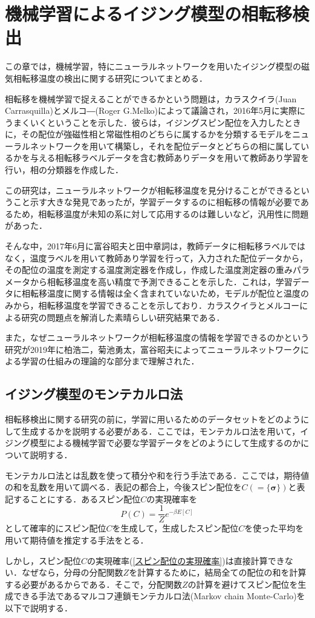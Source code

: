 \documentclass[a4paper,11pt]{jsreport}
\begin{document}
\chapter{機械学習によるイジング模型の相転移検出}
この章では，機械学習，特にニューラルネットワークを用いたイジング模型の磁気相転移温度の検出に関する研究についてまとめる．\par
相転移を機械学習で捉えることができるかという問題は，カラスクイラ(Juan Carrasquilla)とメルコ―(Roger G.Melko)によって議論され，2016年5月に実際にうまくいくということを示した．彼らは，イジングスピン配位を入力したときに，その配位が強磁性相と常磁性相のどちらに属するかを分類するモデルをニューラルネットワークを用いて構築し，それを配位データとどちらの相に属しているかを与える相転移ラベルデータを含む教師ありデータを用いて教師あり学習を行い，相の分類器を作成した．\par
この研究は，ニューラルネットワークが相転移温度を見分けることができるということ示す大きな発見であったが，学習データするのに相転移の情報が必要であるため，相転移温度が未知の系に対して応用するのは難しいなど，汎用性に問題があった．\par
そんな中，2017年6月に富谷昭夫と田中章詞は，教師データに相転移ラベルではなく，温度ラベルを用いて教師あり学習を行って，入力された配位データから，その配位の温度を測定する温度測定器を作成し，作成した温度測定器の重みパラメータから相転移温度を高い精度で予測できることを示した．これは，学習データに相転移温度に関する情報は全く含まれていないため，モデルが配位と温度のみから，相転移温度を学習できることを示しており．カラスクイラとメルコーによる研究の問題点を解消した素晴らしい研究結果である．\par
また，なぜニューラルネットワークが相転移温度の情報を学習できるのかという研究が2019年に柏浩二，菊池勇太，富谷昭夫によってニューラルネットワークによる学習の仕組みの理論的な部分まで理解された．
\section{イジング模型のモンテカルロ法}
相転移検出に関する研究の前に，学習に用いるためのデータセットをどのようにして生成するかを説明する必要がある．ここでは，モンテカルロ法を用いて，イジング模型による機械学習で必要な学習データをどのようにして生成するのかについて説明する．\par
モンテカルロ法とは乱数を使って積分や和を行う手法である．ここでは，期待値の和を乱数を用いて調べる．表記の都合上，今後スピン配位を$C(=\{\bm{\sigma}\})$と表記することにする．あるスピン配位$C$の実現確率を
\begin{equation}
  \label{スピン配位の実現確率}
  P(C)=\frac{1}{Z}e^{-\beta E[C]}
\end{equation}
として確率的にスピン配位$C$を生成して，生成したスピン配位$C$を使った平均を用いて期待値を推定する手法をとる．\par
しかし，スピン配位$C$の実現確率(\ref{スピン配位の実現確率})は直接計算できない．なぜなら，分母の分配関数$Z$を計算するために，結局全ての配位の和を計算する必要があるからである．そこで，分配関数$Z$の計算を避けてスピン配位を生成できる手法であるマルコフ連鎖モンテカルロ法(Markov chain Monte-Carlo)を以下で説明する．
\end{document}
